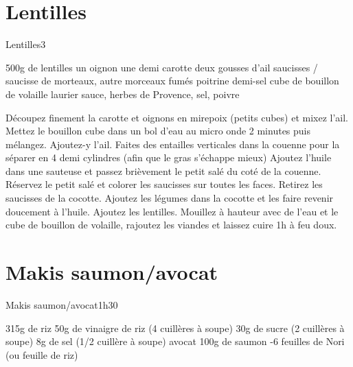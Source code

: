 {\section{Lentilles}
\begin{recette}{Lentilles}{3}{}{}
\begin{ingredients}
\ingredient 500g de lentilles
\ingredient un oignon
\ingredient une demi carotte
\ingredient deux gousses d'ail
 saucisses / saucisse de morteaux, autre morceaux fumés
\ingredient poitrine demi-sel
\ingredient cube de bouillon de volaille
\ingredient laurier sauce, herbes de Provence, sel, poivre
\end{ingredients}

\begin{preparation}
\etape Découpez finement la carotte et oignons en mirepoix (petits cubes) et mixez l'ail.
\etape Mettez le bouillon cube dans un bol d'eau au micro onde 2 minutes puis mélangez. Ajoutez-y l'ail.
\etape Faites des entailles verticales dans la couenne pour la séparer en 4 demi cylindres (afin que le gras s'échappe mieux)
\etape Ajoutez l'huile dans une sauteuse et passez brièvement le petit salé du coté de la couenne.
\etape Réservez le petit salé et colorer les saucisses sur toutes les faces.
\etape Retirez les saucisses de la cocotte.
\etape Ajoutez les légumes dans la cocotte et les faire revenir doucement à l'huile.
\etape Ajoutez les lentilles. Mouillez à hauteur avec de l'eau et le cube de bouillon de volaille, rajoutez les viandes et 
laissez cuire 1h à feu doux.
\end{preparation}
\end{recette}

\section{Makis saumon/avocat}
\begin{recette}{Makis saumon/avocat}{}{1h30}{}
\begin{ingredients}
\ingredient 315g de riz %
\ingredient 50g de vinaigre de riz (4 cuillères à soupe)
\ingredient 30g de sucre (2 cuillères à soupe)
\ingredient 8g de sel (1/2 cuillère à soupe)
 avocat
\ingredient 100g de saumon
-6 feuilles de Nori (ou feuille de riz)
\end{ingredients}


\end{recette}}
